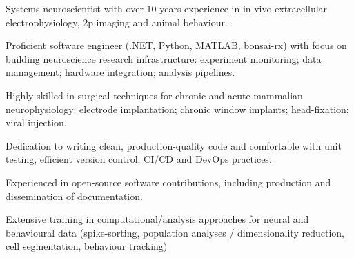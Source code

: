 

\begin{cventries}
    \vspace{2mm}
    \begin{cvparagraph}
        \begin{cvitems}
            \item{Systems neuroscientist with over 10 years experience in in-vivo extracellular electrophysiology, 2p imaging and animal behaviour.}
            \item{Proficient software engineer (.NET, Python, MATLAB, bonsai-rx) with focus on building neuroscience research infrastructure: experiment monitoring;
            data management; hardware integration; analysis pipelines.}
            \item{Highly skilled in surgical techniques for chronic and acute mammalian neurophysiology: electrode implantation; chronic window implants; head-fixation; viral injection.}
            \item{Dedication to writing clean, production-quality code and comfortable with unit testing, efficient version control, CI/CD and DevOps practices.}
            \item{Experienced in open-source software contributions, including production and dissemination of documentation.}
            \item{Extensive training in computational/analysis approaches for neural and behavioural data (spike-sorting, population analyses / dimensionality reduction, cell segmentation, behaviour tracking)}
        \end{cvitems}
    \end{cvparagraph}
\end{cventries}